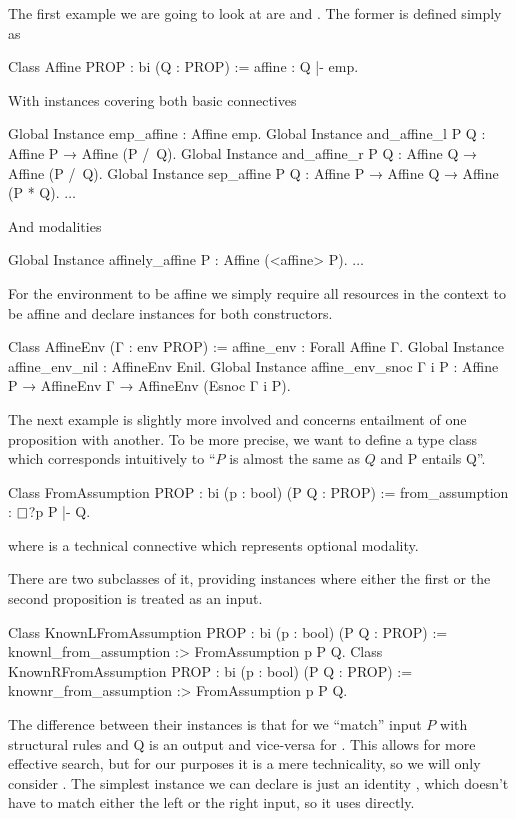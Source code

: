 The first example we are going to look at are  and .
The former is defined simply as
\begin{coq}
Class Affine {PROP : bi} (Q : PROP) := affine : Q |- emp.
\end{coq}

With instances covering both basic connectives
\begin{coq}
Global Instance emp_affine : Affine emp.
Global Instance and_affine_l P Q : Affine P → Affine (P /\ Q).
Global Instance and_affine_r P Q : Affine Q → Affine (P /\ Q).
Global Instance sep_affine P Q : Affine P → Affine Q → Affine (P * Q).
$\ldots$
\end{coq}

And modalities
\begin{coq}
Global Instance affinely_affine P : Affine (<affine> P).
$\ldots$
\end{coq}

For the environment to be affine we simply require all resources in the context to be affine and declare instances for both constructors.
\begin{coq}
Class AffineEnv (Γ : env PROP) := affine_env : Forall Affine Γ.
Global Instance affine_env_nil : AffineEnv Enil.
Global Instance affine_env_snoc Γ i P :
  Affine P → AffineEnv Γ → AffineEnv (Esnoc Γ i P).
\end{coq}

The next example is slightly more involved and concerns entailment of one proposition with another.
To be more precise, we want to define a type class which corresponds intuitively to ``\(P\) is almost the same as \(Q\) and P entails Q''.
\begin{coq}
Class FromAssumption {PROP : bi} (p : bool) (P Q : PROP) :=
  from_assumption : $\mathop{\Box}$?p P |- Q.
\end{coq}
where  is a technical connective which represents optional modality.

There are two subclasses of it, providing instances where either the first or the second proposition is treated as an input.
\begin{coq}
Class KnownLFromAssumption {PROP : bi} (p : bool) (P Q : PROP) :=
  knownl_from_assumption :> FromAssumption p P Q.
Class KnownRFromAssumption {PROP : bi} (p : bool) (P Q : PROP) :=
  knownr_from_assumption :> FromAssumption p P Q.
\end{coq}

The difference between their instances is that for  we ``match'' input \(P\) with structural rules and Q is an output and vice-versa for .
This allows for more effective search, but for our purposes it is a mere technicality, so we will only consider .
The simplest instance we can declare is just an identity , which doesn't have to match either the left or the right input, so it uses  directly.

